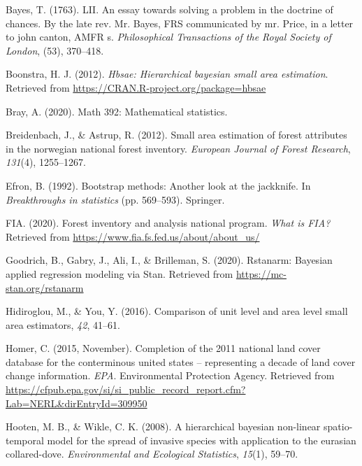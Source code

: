 \documentclass[12pt,twoside]{reedthesis}
\newlength{\cslhangindent}
\newenvironment{CSLReferences}[2] %
 {%
  \setlength{\parindent}{0pt}
  \ifodd #1 \everypar{\setlength{\hangindent}{\cslhangindent}}\ignorespaces\fi
  \ifnum #2 > 0
  \setlength{\parskip}{#2\baselineskip}
  \fi
 }%
 {}
\begin{document}
\hypertarget{refs}{}
\begin{CSLReferences}{1}{0}
\leavevmode{}%
Bayes, T. (1763). LII. An essay towards solving a problem in the doctrine of chances. By the late rev. Mr. Bayes, FRS communicated by mr. Price, in a letter to john canton, AMFR s. \emph{Philosophical Transactions of the Royal Society of London}, (53), 370--418.

\leavevmode{}%
Boonstra, H. J. (2012). \emph{Hbsae: Hierarchical bayesian small area estimation}. Retrieved from \url{https://CRAN.R-project.org/package=hbsae}

\leavevmode{}%
Bray, A. (2020). Math 392: Mathematical statistics.

\leavevmode{}%
Breidenbach, J., \& Astrup, R. (2012). Small area estimation of forest attributes in the norwegian national forest inventory. \emph{European Journal of Forest Research}, \emph{131}(4), 1255--1267.

\leavevmode{}%
Efron, B. (1992). Bootstrap methods: Another look at the jackknife. In \emph{Breakthroughs in statistics} (pp. 569--593). Springer.

\leavevmode{}%
FIA. (2020). Forest inventory and analysis national program. \emph{What is FIA?} Retrieved from \url{https://www.fia.fs.fed.us/about/about_us/}

\leavevmode{}%
Goodrich, B., Gabry, J., Ali, I., \& Brilleman, S. (2020). Rstanarm: {Bayesian} applied regression modeling via {Stan}. Retrieved from \url{https://mc-stan.org/rstanarm}

\leavevmode{}%
Hidiroglou, M., \& You, Y. (2016). Comparison of unit level and area level small area estimators, \emph{42}, 41--61.

\leavevmode{}%
Homer, C. (2015, November). Completion of the 2011 national land cover database for the conterminous united states -- representing a decade of land cover change information. \emph{EPA}. Environmental Protection Agency. Retrieved from \url{https://cfpub.epa.gov/si/si_public_record_report.cfm?Lab=NERL\&dirEntryId=309950}

\leavevmode{}%
Hooten, M. B., \& Wikle, C. K. (2008). A hierarchical bayesian non-linear spatio-temporal model for the spread of invasive species with application to the eurasian collared-dove. \emph{Environmental and Ecological Statistics}, \emph{15}(1), 59--70.


\end{CSLReferences}
\end{document}
